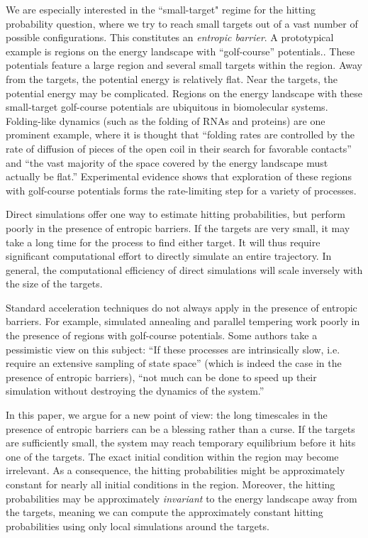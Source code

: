 \documentclass[english, aip, jcp, priprint, graphicx,floatfix]{revtex4-1}
\theoremstyle{plain}
\theoremstyle{definition}
\theoremstyle{plain}
\begin{document}
We are especially interested in the ``small-target" regime for the hitting probability question, where we try to reach small targets out of a vast number of possible configurations. This constitutes an \emph{entropic barrier}. A prototypical example is regions on the energy landscape with ``golf-course'' potentials.\cite{bicout2000entropic, Baum1986-we, Wille1987-tf}. These potentials feature a large region and several small targets within the region.  Away from the targets, the potential energy is relatively flat.  Near the targets, the potential energy may be complicated. Regions on the energy landscape with these small-target golf-course potentials are ubiquitous in biomolecular systems. Folding-like dynamics (such as the folding of RNAs and proteins) are one prominent example, where it is thought that ``folding rates are controlled by the rate of diffusion of pieces of the open coil in their search for favorable contacts'' and ``the vast majority of the space covered by the energy landscape must actually be flat.''\cite{McLeish2005-dq} Experimental evidence shows that exploration of these regions with golf-course potentials forms the rate-limiting step for a variety of processes.\cite{Teschner1987-qs, Jacob1999-bs, Goldberg1999-mv, Plaxco1998-iv}

Direct simulations offer one way to estimate hitting probabilities, but perform poorly in the presence of entropic barriers. If the targets are very small, it may take a long time for the process to find either target.  It will thus require significant  computational effort to directly simulate an entire trajectory. In general, the computational efficiency of direct simulations will scale inversely with the size of the targets.

Standard acceleration techniques do not always apply in the presence of entropic barriers.  For example, simulated annealing and parallel tempering work poorly in the presence of regions with golf-course potentials.\cite{Baum1986-we, Wille1987-tf, Machta2009-gh} Some authors take a pessimistic view on this subject: ``If these processes are intrinsically slow, i.e. require an extensive sampling of state space'' (which is indeed the case in the presence of entropic barriers), ``not much can be done to speed up their simulation without destroying the dynamics of the system.''\cite{Christen2008-ge}

In this paper, we argue for a new point of view: the long timescales in the presence of entropic barriers can be a blessing rather than a curse.  If the targets are sufficiently small, the system may reach temporary equilibrium before it hits one of the targets. The exact initial condition within the region may become irrelevant. As a consequence, the hitting probabilities might be approximately constant for nearly all initial conditions in the region.  Moreover, the hitting probabilities may be approximately \emph{invariant} to the energy landscape away from the targets, meaning we can compute the approximately constant hitting probabilities using only local simulations around the targets.
\end{document}
